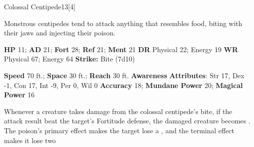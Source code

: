   
  \begin{monsection}{Colossal Centipede}{13}[4]
    \vspace{-1em}\vspace{-1em}
    \vspace{0em}

    
    Monstrous centipedes tend to attack anything that resembles food, biting with their jaws and injecting their poison.
  

    \begin{spellcontent}
      \begin{spelltargetinginfo}
        \pari \textbf{HP} 11;
          \textbf{AD} 21;
          \textbf{Fort} 28;
          \textbf{Ref} 21;
          \textbf{Ment} 21
        \pari \textbf{DR} Physical 22; Energy 19
        \pari \textbf{WR} Physical 67; Energy 64
        \pari \textbf{Strike:}
            Bite  (7d10)
      \end{spelltargetinginfo}
    \end{spellcontent}
    \begin{monsterfooter}
      \pari \textbf{Speed} 70 ft.;
        \textbf{Space} 30 ft.;
        \textbf{Reach} 30 ft.
      \pari \textbf{Awareness} 
      \pari \textbf{Attributes}:
        Str 17, Dex -1,
        Con 17, Int -9,
        Per 0, Wil 0
      \pari \textbf{Accuracy} 18;
        \textbf{Mundane Power} 20;
      \textbf{Magical Power} 16
    \end{monsterfooter}
  \end{monsection}
    Whenever a creature takes damage from the colossal centipede's bite,
      if the attack result beat the target's Fortitude defense,
      the damaged creature becomes .
    The poison's primary effect makes the target lose a , and the terminal effect makes it lose two 
  
